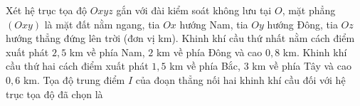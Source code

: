\begin{ex}
Xét hệ trục tọa độ $Oxyz$ gắn với đài kiểm soát không lưu tại $O$, mặt phẳng $(Oxy)$ là mặt đất nằm ngang, tia $Ox$ hướng Nam, tia $Oy$ hướng Đông, tia $Oz$ hướng thẳng đứng lên trời (đơn vị km). Khinh khí cầu thứ nhất nằm cách điểm xuất phát $2{,}5$ km về phía Nam, $2$ km về phía Đông và cao $0{,}8$ km. Khinh khí cầu thứ hai cách điểm xuất phát $1{,}5$ km về phía Bắc, $3$ km về phía Tây và cao $0{,}6$ km. Tọa độ trung điểm $I$ của đoạn thẳng nối hai khinh khí cầu đối với hệ trục tọa độ đã chọn là
\end{ex}
